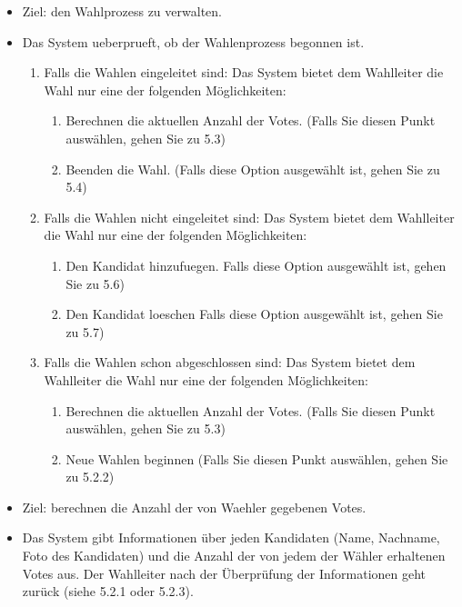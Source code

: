 \documentclass[parskip=full,11pt,twoside]{scrartcl}
\begin{document}
\begin{itemize}
	\item Ziel: den Wahlprozess zu verwalten.
	\item Das System ueberprueft, ob der Wahlenprozess begonnen ist.   
	\begin{enumerate}
		\item Falls die Wahlen eingeleitet sind: Das System bietet dem Wahlleiter die Wahl nur eine der folgenden Möglichkeiten:
		\begin{enumerate}
			\item Berechnen die aktuellen Anzahl der Votes. (Falls Sie diesen Punkt auswählen, gehen Sie zu 5.3)
			\item Beenden die Wahl. (Falls diese Option ausgewählt ist, gehen Sie zu 5.4)
		\end{enumerate}
		\item Falls die Wahlen nicht eingeleitet sind: Das System bietet dem Wahlleiter die Wahl nur eine der folgenden Möglichkeiten:
		\begin{enumerate}
			\item Den Kandidat hinzufuegen. Falls diese Option ausgewählt ist, gehen Sie zu 5.6)
			\item Den Kandidat loeschen Falls diese Option ausgewählt ist, gehen Sie zu 5.7)
		\end{enumerate}
		\item Falls die Wahlen schon abgeschlossen sind: Das System bietet dem Wahlleiter die Wahl nur eine  der   folgenden Möglichkeiten:
		\begin{enumerate}
			\item Berechnen die aktuellen Anzahl der Votes. (Falls Sie diesen Punkt auswählen, gehen Sie zu 5.3)
			\item Neue Wahlen beginnen (Falls Sie diesen Punkt auswählen, gehen Sie zu 5.2.2)
		\end{enumerate}
	\end{enumerate}
\end{itemize}

\begin{itemize}
	\item Ziel: berechnen die Anzahl der von Waehler gegebenen Votes.
	\item Das System gibt Informationen über jeden Kandidaten (Name, Nachname, Foto des Kandidaten) und die Anzahl der von jedem der Wähler erhaltenen Votes aus. Der Wahlleiter nach der Überprüfung der Informationen geht zurück (siehe 5.2.1 oder 5.2.3).
\end{itemize}
\end{document}
